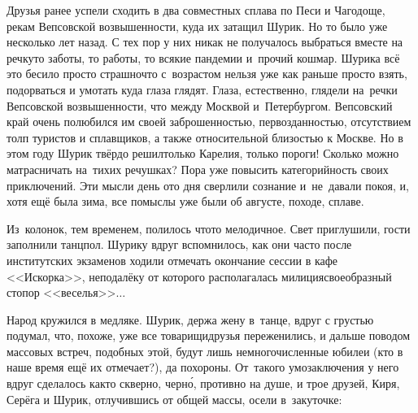 {Друзья ранее успели сходить в два совместных сплава по Песи и Чагодоще, рекам Вепсовской возвышенности, куда их затащил Шурик. Но то было уже несколько лет назад. С тех пор у них никак не получалось выбраться вместе на речку\mdash то заботы, то работы, то всякие пандемии и~прочий кошмар. Шурика всё это бесило просто страшно\mdash что с~возрастом нельзя уже как раньше просто взять, подорваться и умотать куда глаза глядят. Глаза, естественно, глядели на~речки Вепсовской возвышенности, что между Москвой и~Петербургом. Вепсовский край очень полюбился им своей заброшенностью, первозданностью, отсутствием толп туристов и сплавщиков, а также относительной близостью к Москве. Но в этом году Шурик твёрдо решил\mdash только Карелия, только пороги! Сколько можно матрасничать на~тихих речушках? Пора уже повысить категорийность своих приключений. Эти мысли день ото дня сверлили сознание и~не~давали покоя, и, хотя ещё была зима, все помыслы уже были об августе, походе, сплаве.

%
%
%

Из~колонок, тем временем, полилось что\sdash то мелодичное. Свет приглушили, гости заполнили танцпол. Шурику вдруг вспомнилось, как они часто после институтских экзаменов ходили отмечать окончание сессии в кафе <<Искорка>>, неподалёку от которого располагалась милиция\mdash своеобразный стопор <<веселья>>$\ldots$

Народ кружился в медляке. Шурик, держа жену в~танце, вдруг с грустью подумал, что, похоже, уже все товарищи\sdash друзья переженились, и дальше поводом массовых встреч, подобных этой, будут лишь немногочисленные юбилеи (кто в наше время ещё их отмечает?), да похороны. От~такого умозаключения у него вдруг сделалось как\sdash то скверно, черн\'{о}, противно на душе, и трое друзей, Киря, Серёга и Шурик, отлучившись от общей массы, осели в~закуточке:

}
